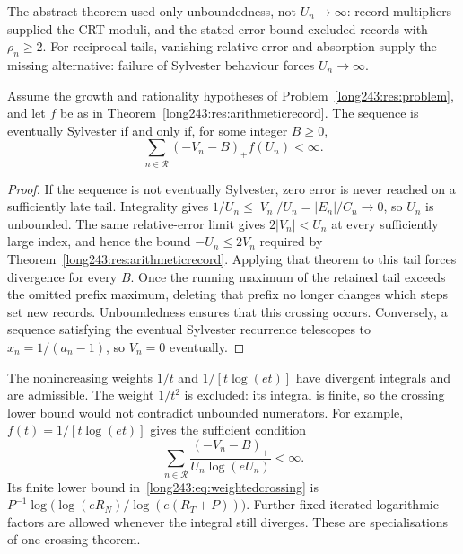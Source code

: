 The abstract theorem used only unboundedness, not $U_n\to\infty$:
record multipliers supplied the CRT moduli, and the stated error bound
excluded records with $\rho_n\ge2$. For reciprocal tails, vanishing
relative error and absorption supply the missing alternative: failure
of Sylvester behaviour forces $U_n\to\infty$.

\begin{theorem}\label{long243:res:weightedrecord}
Assume the growth and rationality hypotheses of Problem~\ref{long243:res:problem},
and let $f$ be as in Theorem~\ref{long243:res:arithmeticrecord}. The sequence is
eventually Sylvester if and only if, for some integer $B\ge0$,
\[
 \sum_{n\in\mathcal R}(-V_n-B)_+f(U_n)<\infty.
\]
\end{theorem}

\begin{proof}
If the sequence is not eventually Sylvester, zero error is never reached on a sufficiently late
tail. Integrality gives $1/U_n\le|V_n|/U_n=|E_n|/C_n\to0$, so $U_n$ is
unbounded. The same relative-error limit gives $2|V_n|<U_n$ at every
sufficiently large index, and hence the bound $-U_n\le2V_n$ required
by Theorem~\ref{long243:res:arithmeticrecord}. Applying that theorem to
this tail forces divergence for every $B$. Once the running maximum of
the retained tail exceeds the omitted prefix maximum, deleting that
prefix no longer changes which steps set new records. Unboundedness
ensures that this crossing occurs. Conversely, a sequence satisfying
the eventual Sylvester recurrence
telescopes to $x_n=1/(a_n-1)$, so $V_n=0$ eventually.
\end{proof}

The nonincreasing weights $1/t$ and $1/[t\log(et)]$ have divergent
integrals and are admissible. The weight $1/t^2$ is excluded: its
integral is finite, so the crossing lower bound would not contradict
unbounded numerators. For example, $f(t)=1/[t\log(et)]$ gives
the sufficient condition
\[
 \sum_{n\in\mathcal R}\frac{(-V_n-B)_+}{U_n\log(eU_n)}<\infty.
\]
Its finite lower bound in~\eqref{long243:eq:weightedcrossing} is
$P^{-1}\log\bigl(\log(eR_N)/\log(e(R_T+P))\bigr)$.
Further fixed iterated logarithmic factors are allowed whenever the integral
still diverges. These are specialisations of one crossing theorem.

